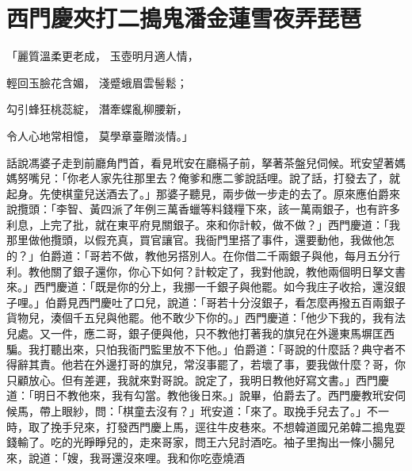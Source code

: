 %

\chapter{西門慶夾打二搗鬼\KG 潘金蓮雪夜弄琵琶}


「麗質溫柔更老成，  玉壺明月適人情，

輕回玉臉花含媚，  淺蹙蛾眉雲髻鬆；

勾引蜂狂桃蕊綻，  潛牽蝶亂柳腰新，

令人心地常相憶，  莫學章臺贈淡情。」

話說馮婆子走到前廳角門首，看見玳安在廳槅子前，拏著茶盤兒伺候。玳安望著媽媽努嘴兒：「你老人家先往那里去？俺爹和應二爹說話哩。說了話，打發去了，就起身。先使棋童兒送酒去了。」那婆子聽見，兩步做一步走的去了。原來應伯爵來說攬頭：「李智、黃四派了年例三萬香蠟等料錢糧下來，該一萬兩銀子，也有許多利息，上完了批，就在東平府見關銀子。來和你計較，做不做？」西門慶道：「我那里做他攬頭，以假充真，買官讓官。我衙門里搭了事件，還要動他，我做他怎的？」伯爵道：「哥若不做，教他另搭別人。在你借二千兩銀子與他，每月五分行利。教他關了銀子還你，你心下如何？計較定了，我對他說，教他兩個明日拏文書來。」西門慶道：「既是你的分上，我挪一千銀子與他罷。如今我庄子收拾，還沒銀子哩。」伯爵見西門慶吐了口兒，說道：「哥若十分沒銀子，看怎麼再撥五百兩銀子貨物兒，湊個千五兒與他罷。他不敢少下你的。」西門慶道：「他少下我的，我有法兒處。又一件，應二哥，銀子便與他，只不教他打著我的旗兒在外邊東馬塀匡西騙。我打聽出來，只怕我衙門監里放不下他。」伯爵道：「哥說的什麼話？典守者不得辭其責。他若在外邊打哥的旗兒，常沒事罷了，若壞了事，要我做什麼？哥，你只顧放心。但有差遲，我就來對哥說。說定了，我明日教他好寫文書。」西門慶道：「明日不教他來，我有勾當。教他後日來。」說畢，伯爵去了。西門慶教玳安伺候馬，帶上眼紗，問：「棋童去沒有？」玳安道：「來了。取挽手兒去了。」不一時，取了挽手兒來，打發西門慶上馬，逕往牛皮巷來。不想韓道國兄弟韓二搗鬼耍錢輸了。吃的光睜睜兒的，走來哥家，問王六兒討酒吃。袖子里掏出一條小腸兒來，說道：「嫂，我哥還沒來哩。我和你吃壺燒酒 
